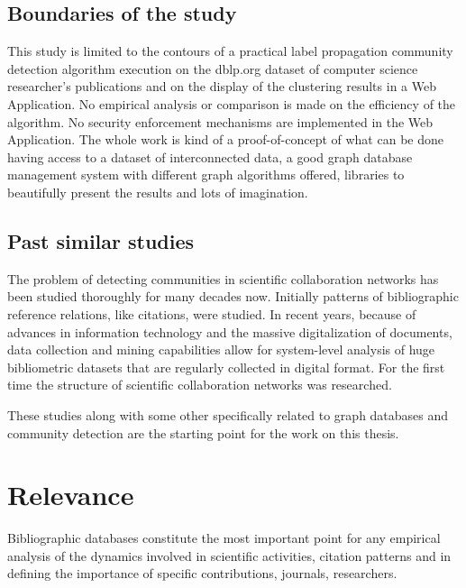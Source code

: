 \subsection{Boundaries of the study} \label{subsection:Introduction/Context/Boundariesofthestudy}
This study is limited to the contours of a practical label propagation community detection algorithm execution on the \gls{dblp.org} dataset of computer science researcher's publications and on the display of the clustering results in a \gls{Web Application}.
No empirical analysis or comparison is made on the efficiency of the algorithm.
No security enforcement mechanisms are implemented in the \gls{Web Application}.
The whole work is kind of a proof-of-concept of what can be done having access to a dataset of interconnected data, a good graph database management system with different graph algorithms offered, libraries to beautifully present the results and lots of imagination.

\subsection{Past similar studies} \label{subsection:Introduction/Context/Pastsimilarstudies}
The problem of detecting communities in scientific collaboration networks has been studied thoroughly for many decades now.
Initially patterns of bibliographic reference relations, like citations, were studied.
In recent years, because of advances in information technology and the massive digitalization of documents, data collection and mining capabilities allow for system-level analysis of huge bibliometric datasets that are regularly collected in digital format.
For the first time the structure of scientific collaboration networks was researched.

These studies along with some other specifically related to graph databases and community detection are the starting point for the work on this thesis.

\section{Relevance} \label{section:Introduction/Relevance}
Bibliographic databases constitute the most important point for any empirical analysis of
the dynamics involved in scientific activities, citation patterns and in defining the importance of specific contributions, journals, researchers.

